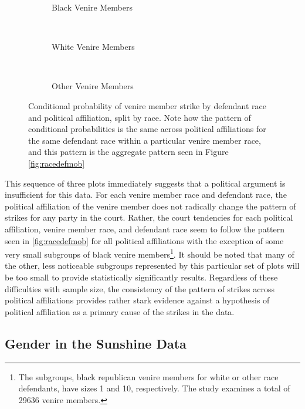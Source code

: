 \begin{figure}[h!]
  \centering
  \begin{subfigure}{0.40\textwidth}
    \caption{\footnotesize Black Venire Members}
    \label{fig:blackdefpol}
  \end{subfigure}
  ~
  \begin{subfigure}{0.40\textwidth}
    \caption{\footnotesize White Venire Members}
    \label{fig:whitedefpol}
  \end{subfigure}
  ~
  \begin{subfigure}{0.40\textwidth}
    \caption{\footnotesize Other Venire Members}
    \label{fig:otherdefpol}
  \end{subfigure}
  \caption[Strikes by Political Affiliation, Race, and Defendant Race (Sunshine)]
  {\footnotesize Conditional probability of venire member strike by defendant race and political affiliation, split by race. Note how the
    pattern of conditional probabilities is the same across political affiliations for the same defendant race within a particular
    venire member race, and this pattern is the aggregate pattern seen in Figure \ref{fig:racedefmob}} \label{fig:racedefpol}
\end{figure}

This sequence of three plots immediately suggests that a political argument is insufficient for this data. For each venire member
race and defendant race, the political affiliation of the venire member does not radically change the pattern of strikes for any
party in the court. Rather, the court tendencies for each political affiliation, venire member race, and defendant race seem to
follow the pattern seen in \ref{fig:racedefmob} for all political affiliations with the exception of some very small subgroups of
black venire members\footnote{The subgroups, black republican venire members for white or other race defendants, have sizes 1 and
  10, respectively. The study examines a total of 29636 venire members.}. It should be noted that many of the other, less
noticeable subgroups represented by this particular set of plots will be too small to provide statistically significantly
results. Regardless of these difficulties with sample size, the consistency of the pattern of strikes across political
affiliations provides rather stark evidence against a hypothesis of political affiliation as a primary cause of the strikes in the
data.

\subsection{Gender in the Sunshine Data}

